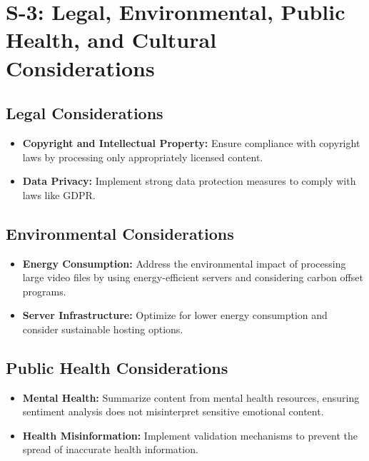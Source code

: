 \documentclass{bscs}
\begin{document}
\section{S-3: Legal, Environmental, Public Health, and Cultural Considerations}

\subsection{Legal Considerations}

\begin{itemize}
    \item \textbf{Copyright and Intellectual Property:} Ensure compliance with copyright laws by
processing only appropriately licensed content. 
    
    \item \textbf{Data Privacy:}  Implement strong data protection measures to comply with laws like GDPR.   

\end{itemize}

\subsection{Environmental Considerations}

\begin{itemize}
    \item \textbf{Energy Consumption:} Address the environmental impact of processing large video files by using energy-efficient servers and considering carbon offset programs.  
    
    \item \textbf{Server Infrastructure:} Optimize for lower energy consumption and consider sustainable hosting options.

\end{itemize}

\subsection{Public Health Considerations}

\begin{itemize}
    \item \textbf{Mental Health:} Summarize content from mental health resources, ensuring sentiment analysis does not misinterpret sensitive emotional content. 
    
    \item \textbf{Health Misinformation:}  Implement validation mechanisms to prevent the spread of
inaccurate health information.

\end{itemize}
\end{document}
